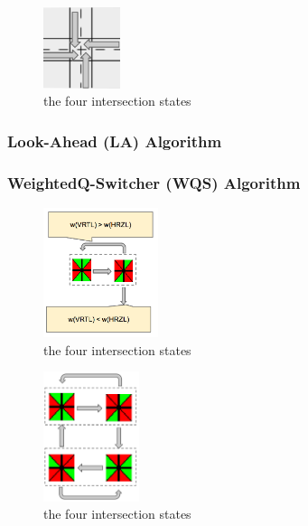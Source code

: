 \documentclass[conference]{IEEEtran}
\begin{document}
\begin{figure}[h]
    \center    
    \includegraphics[width=0.2\textwidth]{images/direction.png}
	\caption{the four intersection states}
	\label{intersection_states}
\end{figure}



\subsubsection{ Look-Ahead (LA) Algorithm}

\subsubsection{ WeightedQ-Switcher (WQS) Algorithm}

\begin{figure}[h]
    \center    
    \includegraphics[width=0.3\textwidth]{images/wqs_decision.png}
	\caption{the four intersection states}
	\label{intersection_states}
\end{figure}

\begin{figure}[h]
    \center    
    \includegraphics[width=0.25\textwidth]{images/wqs_state.png}
	\caption{the four intersection states}
	\label{intersection_states}
\end{figure}
\end{document}

